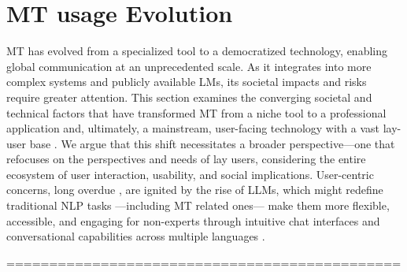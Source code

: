 \section{MT usage Evolution }
MT has evolved from a specialized tool to a democratized technology, enabling global communication at an unprecedented scale. As it integrates into more complex systems and publicly available LMs, its societal impacts and risks require greater attention. This section examines the converging societal and technical factors that have transformed MT from a niche tool to a professional application and, ultimately, a mainstream, user-facing technology with a vast lay-user base . We argue that this shift necessitates a broader perspective---one that refocuses on the perspectives and needs of lay users, considering the entire ecosystem of user interaction, usability, and social implications. User-centric concerns, long overdue \citep{green2015natural, Schuff_Vanderlyn_Adel_Vu_2023}, are ignited by the rise of LLMs, which might redefine 
traditional NLP tasks \citep{ouyang2023shifted}---including MT related ones---%
make them more flexible, accessible, and engaging for non-experts through intuitive chat interfaces and conversational capabilities across multiple languages .




























==============================================


